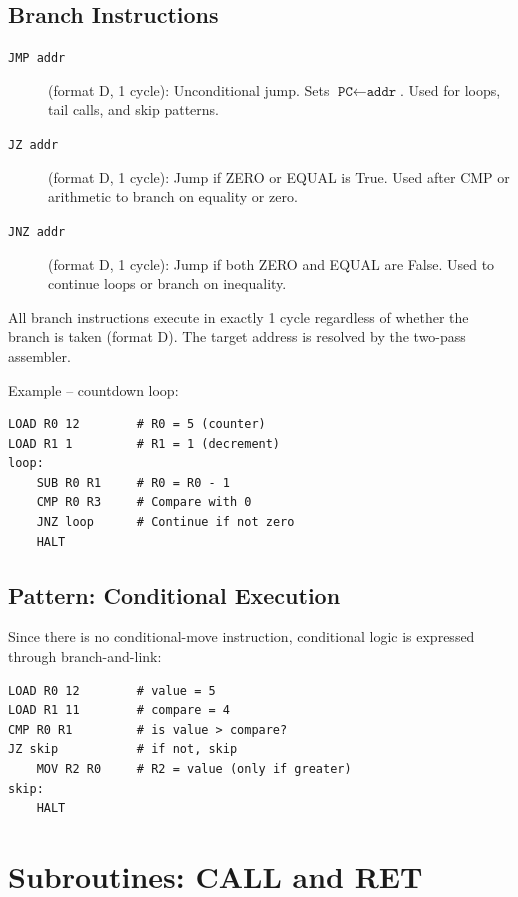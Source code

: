 \documentclass[10pt,a4paper,twoside]{book}
\begin{document}
\section{Branch Instructions}

\begin{description}
    \item[\texttt{JMP addr}] (format D, 1 cycle): Unconditional jump. Sets
          $\texttt{PC} \gets \texttt{addr}$. Used for loops, tail calls, and
          skip patterns.
    \item[\texttt{JZ addr}] (format D, 1 cycle): Jump if ZERO or EQUAL is True.
          Used after CMP or arithmetic to branch on equality or zero.
    \item[\texttt{JNZ addr}] (format D, 1 cycle): Jump if both ZERO and EQUAL are
          False. Used to continue loops or branch on inequality.
\end{description}

All branch instructions execute in exactly 1 cycle regardless of whether the branch
is taken (format D). The target address is resolved by the two-pass assembler.

Example -- countdown loop:
\begin{lstlisting}
LOAD R0 12        # R0 = 5 (counter)
LOAD R1 1         # R1 = 1 (decrement)
loop:
    SUB R0 R1     # R0 = R0 - 1
    CMP R0 R3     # Compare with 0
    JNZ loop      # Continue if not zero
    HALT
\end{lstlisting}

\section{Pattern: Conditional Execution}

Since there is no conditional-move instruction, conditional logic is expressed
through branch-and-link:
\begin{lstlisting}
LOAD R0 12        # value = 5
LOAD R1 11        # compare = 4
CMP R0 R1         # is value > compare?
JZ skip           # if not, skip
    MOV R2 R0     # R2 = value (only if greater)
skip:
    HALT
\end{lstlisting}

\chapter{Subroutines: CALL and RET}
\label{ch:subroutines}
\end{document}
